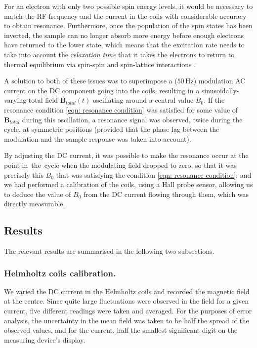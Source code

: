 \documentclass[a4paper]{jpconf}
\numberwithin{equation}{section}
\begin{document}
For an electron with only two possible spin energy levels, it would be necessary to match the RF frequency and the current in the coils with considerable accuracy to obtain resonance. Furthermore, once the population of the spin states has been inverted, the sample can no longer absorb more energy before enough electrons have returned to the lower state, which means that the excitation rate needs to take into account the \emph{relaxation time} that it takes the electrons to return to thermal equilibrium via spin-spin and spin-lattice interactions \cite{Lancaster}. 

A solution to both of these issues was to superimpose a ($50 \, \si{\hertz}$) modulation AC current on the DC component going into the coils, resulting in a sinusoidally-varying total field $\mathbf{B}_{total}(t)$ oscillating around a central value $B_0$. If the resonance condition \eqref{eqn: resonance condition} was satisfied for some value of $\mathbf{B}_{total}$ during this oscillation, a resonance signal was observed, twice during the cycle, at symmetric positions (provided that the phase lag between the modulation and the sample response was taken into account). 

By adjusting the DC current, it was possible to make the resonance occur at the point in~the~cycle when the modulating field dropped to zero, so that it was precisely this $B_0$ that was satisfying the condition \eqref{eqn: resonance condition}; and we had performed a calibration of the coils, using a Hall probe sensor, allowing us to deduce the value of $B_0$ from the DC current flowing through them, which was directly measurable. 

\subsection{Results}
The relevant results are summarised in the following two subsections.

\subsubsection{Helmholtz coils calibration.} \label{section: calibration}
We varied the DC current in the Helmholtz coils and recorded the magnetic field at the centre. Since quite large fluctuations were observed in the field for a given current, five different readings were taken and averaged. For the purposes of error analysis, the uncertainty in the mean field was taken to be half the spread of the observed values, and for the current, half the smallest significant digit on the measuring device's display. 
\end{document}
